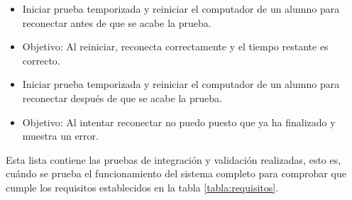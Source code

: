 \begin{itemize}
    \item Iniciar prueba temporizada y reiniciar el computador de un alumno para reconectar antes de que se acabe la prueba.
    \item Objetivo: Al reiniciar, reconecta correctamente y el tiempo restante es correcto.
    \newline

    \item Iniciar prueba temporizada y reiniciar el computador de un alumno para reconectar después de que se acabe la prueba.
    \item Objetivo: Al intentar reconectar no puedo puesto que ya ha finalizado y muestra un error.
    \newline

\end{itemize}


Esta lista contiene las pruebas de integración y validación realizadas, esto es, cuándo se prueba el funcionamiento del sistema completo para comprobar que cumple los requisitos establecidos en la tabla \ref{tabla:requisitos}.
\newline

